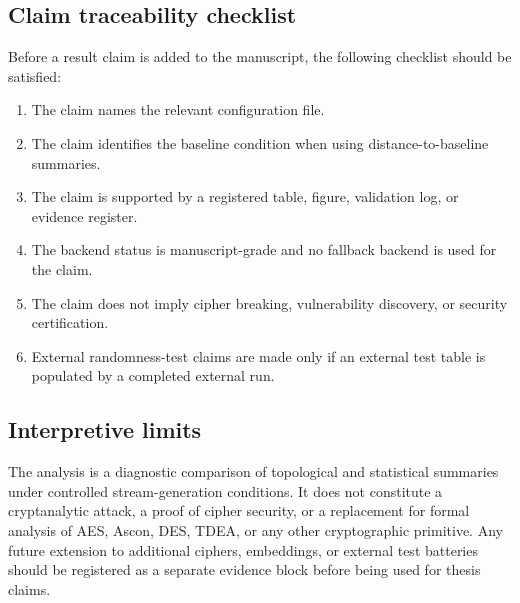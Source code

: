 \subsection{Claim traceability checklist}
\label{app:claim-traceability-checklist}

Before a result claim is added to the manuscript, the following checklist should be satisfied:

\begin{enumerate}
  \item The claim names the relevant configuration file.
  \item The claim identifies the baseline condition when using distance-to-baseline summaries.
  \item The claim is supported by a registered table, figure, validation log, or evidence register.
  \item The backend status is manuscript-grade and no fallback backend is used for the claim.
  \item The claim does not imply cipher breaking, vulnerability discovery, or security certification.
  \item External randomness-test claims are made only if an external test table is populated by a completed external run.
\end{enumerate}

\subsection{Interpretive limits}
\label{app:interpretive-limits}

The analysis is a diagnostic comparison of topological and statistical summaries under controlled stream-generation conditions. It does not constitute a cryptanalytic attack, a proof of cipher security, or a replacement for formal analysis of AES, Ascon, DES, TDEA, or any other cryptographic primitive. Any future extension to additional ciphers, embeddings, or external test batteries should be registered as a separate evidence block before being used for thesis claims.
